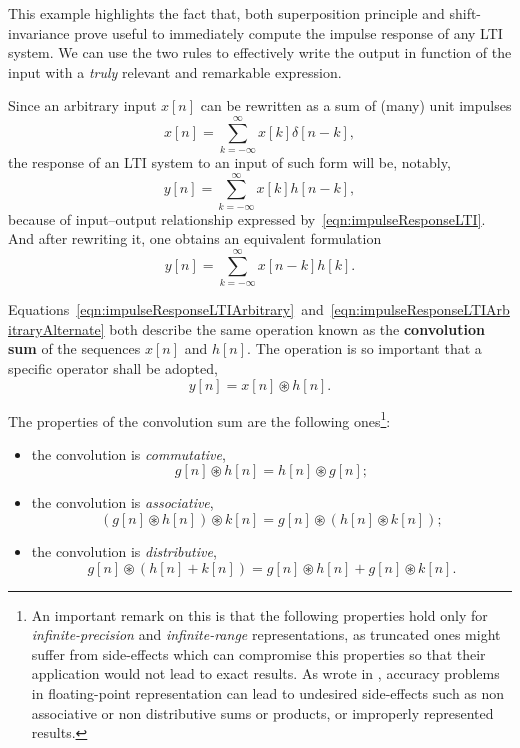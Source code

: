 \documentclass[\documentfontsize, twocolumn]{\classname}
\begin{document}
This example highlights the fact that, both superposition principle and shift-invariance prove useful to immediately compute the impulse response of any LTI system. We can use the two rules to effectively write the output in function of the input with a \emph{truly} relevant and remarkable expression.

Since an arbitrary input $x[n]$ can be rewritten as a sum of (many) unit impulses
\begin{equation}\label{eqn:inputAsSumOfImpulses}
    x[n] = \sum_{k=-\infty}^\infty x[k] \delta[n-k],
\end{equation}
the response of an LTI system to an input of such form will be, notably,
\begin{equation}\label{eqn:impulseResponseLTIArbitrary}
    y[n] = \sum_{k=-\infty}^\infty x[k] h[n-k],
\end{equation}
because of input--output relationship expressed by~\ref{eqn:impulseResponseLTI}. And after rewriting it, one obtains an equivalent formulation
\begin{equation}\label{eqn:impulseResponseLTIArbitraryAlternate}
    y[n] = \sum_{k=-\infty}^\infty x[n-k] h[k].
\end{equation}

Equations~\ref{eqn:impulseResponseLTIArbitrary}~and~\ref{eqn:impulseResponseLTIArbitraryAlternate} both describe the same operation known as the \textbf{convolution sum} of the sequences $x[n]$ and $h[n]$. The operation is so important that a specific operator shall be adopted,
\begin{equation}\label{eqn:convolutionSum}
    y[n] = x[n] \circledast h[n].
\end{equation}

The properties of the convolution sum are the following ones\footnote{An important remark on this is that the following properties hold only for \emph{infinite-precision} and \emph{infinite-range} representations, as truncated ones might suffer from side-effects which can compromise this properties so that their application would not lead to exact results. As wrote in \cite{bib:floatingPointPrecisionIssues}, accuracy problems in floating-point representation can lead to undesired side-effects such as non associative or non distributive sums or products, or improperly represented results.}:
\begin{itemize}
    \item the convolution is \emph{commutative},\[ g[n] \circledast h[n] = h[n] \circledast g[n];\]
    \item the convolution is \emph{associative},\[ (g[n] \circledast h[n]) \circledast k[n] = g[n] \circledast (h[n] \circledast k[n]);\]
    \item the convolution is \emph{distributive},\[ g[n] \circledast (h[n] + k[n]) = g[n] \circledast h[n] + g[n] \circledast k[n].\]
\end{itemize}
\end{document}
